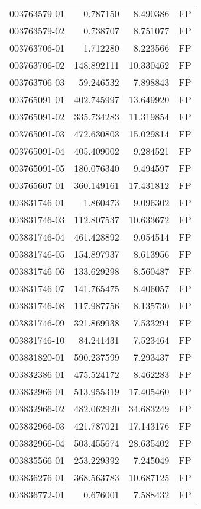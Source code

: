 \begin{tabular}{lrrl}
003763579-01 &    0.787150 &     8.490386 &   FP \\
003763579-02 &    0.738707 &     8.751077 &   FP \\
003763706-01 &    1.712280 &     8.223566 &   FP \\
003763706-02 &  148.892111 &    10.330462 &   FP \\
003763706-03 &   59.246532 &     7.898843 &   FP \\
003765091-01 &  402.745997 &    13.649920 &   FP \\
003765091-02 &  335.734283 &    11.319854 &   FP \\
003765091-03 &  472.630803 &    15.029814 &   FP \\
003765091-04 &  405.409002 &     9.284521 &   FP \\
003765091-05 &  180.076340 &     9.494597 &   FP \\
003765607-01 &  360.149161 &    17.431812 &   FP \\
003831746-01 &    1.860473 &     9.096302 &   FP \\
003831746-03 &  112.807537 &    10.633672 &   FP \\
003831746-04 &  461.428892 &     9.054514 &   FP \\
003831746-05 &  154.897937 &     8.613956 &   FP \\
003831746-06 &  133.629298 &     8.560487 &   FP \\
003831746-07 &  141.765475 &     8.406057 &   FP \\
003831746-08 &  117.987756 &     8.135730 &   FP \\
003831746-09 &  321.869938 &     7.533294 &   FP \\
003831746-10 &   84.241431 &     7.523464 &   FP \\
003831820-01 &  590.237599 &     7.293437 &   FP \\
003832386-01 &  475.524172 &     8.462283 &   FP \\
003832966-01 &  513.955319 &    17.405460 &   FP \\
003832966-02 &  482.062920 &    34.683249 &   FP \\
003832966-03 &  421.787021 &    17.143176 &   FP \\
003832966-04 &  503.455674 &    28.635402 &   FP \\
003835566-01 &  253.229392 &     7.245049 &   FP \\
003836276-01 &  368.563783 &    10.687125 &   FP \\
003836772-01 &    0.676001 &     7.588432 &   FP \\

\end{tabular}

